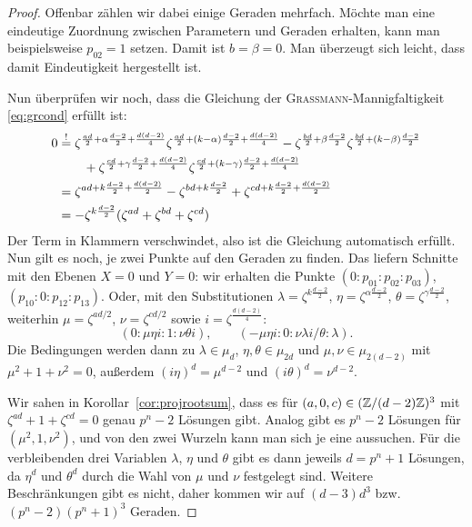\begin{proof}
Offenbar zählen wir dabei einige Geraden mehrfach. Möchte man eine eindeutige Zuordnung zwischen Parametern und Geraden erhalten, kann man beispielsweise $p_{02} = 1$ setzen. Damit ist $b = \beta = 0$. Man überzeugt sich leicht, dass damit Eindeutigkeit hergestellt ist.

Nun überprüfen wir noch, dass die Gleichung der \textsc{Grassmann}-Mannigfaltigkeit \eqref{eq:grcond} erfüllt ist:
\begin{align*}
0 &\overrel{=}^! \zeta^{\frac{ad}2+\alpha\frac{d-2}2+\frac{d(d-2)}4} \zeta^{\frac{ad}2+(k-\alpha)\frac{d-2}2+\frac{d(d-2)}4} - \zeta^{\frac{bd}2+\beta\frac{d-2}2} \zeta^{\frac{bd}2+(k-\beta)\frac{d-2}2} \\
  &\qquad + \zeta^{\frac{cd}2+\gamma\frac{d-2}2+\frac{d(d-2)}4} \zeta^{\frac{cd}2+(k-\gamma)\frac{d-2}2+\frac{d(d-2)}4} \\
  &= \zeta^{ad + k\frac{d-2}2 + \frac{d(d-2)}2} - \zeta^{bd + k\frac{d-2}2} + \zeta^{cd + k\frac{d-2}2 + \frac{d(d-2)}2} \\
  &= -\zeta^{k\frac{d-2}2}(\zeta^{ad} + \zeta^{bd} + \zeta^{cd})
\end{align*}
Der Term in Klammern verschwindet, also ist die Gleichung automatisch erfüllt. Nun gilt es noch, je zwei Punkte auf den Geraden zu finden. Das liefern Schnitte mit den Ebenen $X=0$ und $Y=0$: wir erhalten die Punkte $(0:p_{01}:p_{02}:p_{03})$, $(p_{10}:0:p_{12}:p_{13})$. Oder, mit den Substitutionen $\lambda = \zeta^{k \frac{d-2}2}$, $\eta = \zeta^{\alpha \frac{d-2}2}$, $\theta = \zeta^{\gamma\frac{d-2}2}$, weiterhin $\mu = \zeta^{ad/2}$, $\nu = \zeta^{cd/2}$ sowie $i = \zeta^{\frac{d(d-2)}4}$:
\begin{equation}
(0:\mu\eta i:1:\nu\theta i),\qquad
(-\mu\eta i:0:\nu\lambda i/\theta:\lambda).
\end{equation}
Die Bedingungen werden dann zu $\lambda \in \mu_d$, $\eta, \theta \in \mu_{2d}$ und $\mu, \nu \in \mu_{2(d-2)}$ mit $\mu^2 + 1 + \nu^2 = 0$, außerdem $(i\eta)^d = \mu^{d-2}$ und $(i\theta)^d = \nu^{d-2}$.

Wir sahen in Korollar~\ref{cor:projrootsum}, dass es für $(a,0,c) \in (\Zmod (d-2)Z)^3$ mit $\zeta^{ad} + 1 + \zeta^{cd} = 0$ genau $p^n-2$ Lösungen gibt. Analog gibt es $p^n-2$ Lösungen für $(\mu^2, 1, \nu^2)$, und von den zwei Wurzeln kann man sich je eine aussuchen. Für die verbleibenden drei Variablen $\lambda$, $\eta$ und $\theta$ gibt es dann jeweils $d=p^n+1$ Lösungen, da $\eta^d$ und $\theta^d$ durch die Wahl von $\mu$ und $\nu$ festgelegt sind. Weitere Beschränkungen gibt es nicht, daher kommen wir auf $(d-3)d^3$ bzw. $(p^n-2)(p^n+1)^3$ Geraden.


\end{proof}
